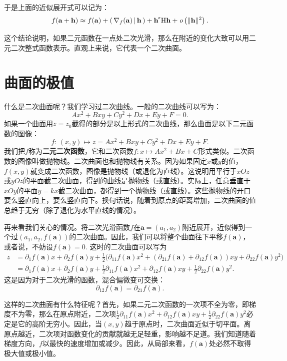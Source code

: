 \documentclass[12pt,UTF8]{ctexbook}
\begin{document}
于是上面的近似展开式可以记为：
\begin{align*}
    f(\mathbf{a} + \mathbf{h}) \approx f(\mathbf{a}) + \nji{\nabla_f(\mathbf{a})}{\mathbf{h}} + \mathbf{h}^{\tr} \mathrm{H} \mathbf{h} + \olim{\|\mathbf{h}\|^2}.
\end{align*}

这个结论说明，如果二元函数在一点处二次光滑，那么在附近的变化大致可以用二元二次整式函数表示。直观上来说，它代表一个二次曲面。

\section{曲面的极值}

什么是二次曲面呢？我们学习过二次曲线。一般的二次曲线可以写为：
$$ Ax^2 + Bxy + Cy^2 + Dx + Ey + F = 0.$$
如果一个曲面用$z = z_0$截得的部分是以上形式的二次曲线，那么曲面是以下二元函数的图像：
$$ f: \, (x, y) \mapsto z = Ax^2 + Bxy + Cy^2 + Dx + Ey + F. $$
我们把$f$称为\textbf{二元二次函数}，它和二次函数$f:x\mapsto Ax^2 +Bx + C$形式类似。二次函数的图像叫做抛物线。二次曲面也和抛物线有关系。因为如果固定$x$或$y$的值，$f(x,y)$就变成二次函数，图像是抛物线（或退化为直线）。这说明用平行于$xOz$或$yOz$的平面截二次曲面，得到的曲线是抛物线（或直线）。实际上，任意垂直于$xOy$的平面$y = kx$截二次曲面，都得到一个抛物线（或直线）。这些抛物线的开口要么竖直向上，要么竖直向下。换句话说，随着到原点的距离增加，二次曲面的值总趋于无穷（除了退化为水平直线的情况）。

再来看我们关心的情况。将二次光滑函数$f$在$\mathbf{a}=(a_1,a_2)$附近展开，近似得到一个过$(a_1,a_2,f(\mathbf{a}))$的二次曲面。因此，我们可以将整个曲面往下平移$f(\mathbf{a})$，或者说，不妨设$f(\mathbf{a}) = 0.$ 这时的二次曲面可以写为
\begin{align*}
    z &= \partial_1 f(\mathbf{a}) x + \partial_2 f(\mathbf{a}) y + \frac{1}{2} \bigg(\partial_{11} f(\mathbf{a})x^2 + (\partial_{21} f(\mathbf{a}) + \partial_{12} f(\mathbf{a}))xy + \partial_{22} f(\mathbf{a})y^2\bigg) \\
    &= \partial_1 f(\mathbf{a}) x + \partial_2 f(\mathbf{a}) y + \frac{1}{2} \partial_{11} f(\mathbf{a})x^2 + \partial_{12} f(\mathbf{a})xy + \frac{1}{2}\partial_{22} f(\mathbf{a})y^2.
\end{align*}
这是因为对于二次光滑的函数，混合偏微变可交换：
$$ \partial_{12} f(\mathbf{a}) = \partial_{21} f(\mathbf{a}).$$

这样的二次曲面有什么特征呢？首先，如果二元二次函数的一次项不全为零，即梯度不为零，那么在原点附近，二次项$\frac{1}{2} \partial_{11} f(\mathbf{a})x^2 + \partial_{12} f(\mathbf{a})xy + \frac{1}{2}\partial_{22} f(\mathbf{a})y^2$必定是它的高阶无穷小。因此，当$(x,y)$趋于原点时，二次曲面近似于切平面。离原点越近，二次项对函数变化的贡献就越无足轻重，影响越不足道。我们知道随着梯度方向，$f$以最快的速度增加或减少。因此，从局部来看，$f(\mathbf{a})$处必然不取得极大值或极小值。
\end{document}
